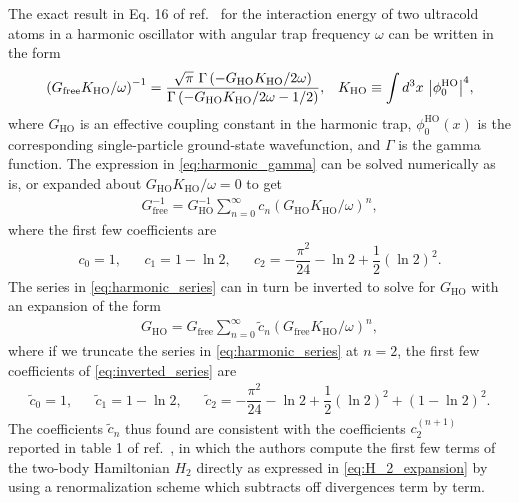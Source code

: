 \documentclass[preprint,showkeys,nofootinbib]{revtex4-1}
\renewcommand{\t}{\text} %
\newcommand{\f}{\dfrac} %
\newcommand{\p}[1]{\left(#1\right)} %
\newcommand{\1}{\mathds{1}}
\begin{document}
The exact result in Eq. 16 of ref.~\cite{busch1998two} for the
interaction energy of two ultracold atoms in a harmonic oscillator
with angular trap frequency $\omega$ can be written in the form
\begin{align}
  \p{G_{\t{free}} K_{\t{HO}}/\omega}^{-1}
  = \f{\sqrt{\pi}~ \Gamma\p{-G_{\t{HO}}K_{\t{HO}}/2\omega}}
  {\Gamma\p{-G_{\t{HO}}K_{\t{HO}}/2\omega-1/2}},
  &&
  K_{\t{HO}} \equiv \int d^3x~ \abs{\phi_0^{\t{HO}}}^4,
  \label{eq:harmonic_gamma}
\end{align}
where $G_{\t{HO}}$ is an effective coupling constant in the harmonic
trap, $\phi_0^{\t{HO}}\p{x}$ is the corresponding single-particle
ground-state wavefunction, and $\Gamma$ is the gamma function.  The
expression in \eqref{eq:harmonic_gamma} can be solved numerically as
is, or expanded about $G_{\t{HO}}K_{\t{HO}}/\omega=0$ to get
\begin{align}
  G_{\t{free}}^{-1} = G_{\t{HO}}^{-1}
  \sum_{n=0}^\infty c_n \p{G_{\t{HO}}K_{\t{HO}}/\omega}^n,
  \label{eq:harmonic_series}
\end{align}
where the first few coefficients are
\begin{align}
  c_0 = 1,
  &&
  c_1 = 1 - \ln 2,
  &&
  c_2 = -\f{\pi^2}{24} - \ln 2 + \f12 \p{\ln 2}^2.
\end{align}
The series in \eqref{eq:harmonic_series} can in turn be inverted to
solve for $G_{\t{HO}}$ with an expansion of the form
\begin{align}
  G_{\t{HO}} = G_{\t{free}}
  \sum_{n=0}^\infty \tilde c_n \p{G_{\t{free}}K_{\t{HO}}/\omega}^n,
  \label{eq:inverted_series}
\end{align}
where if we truncate the series in \eqref{eq:harmonic_series} at
$n=2$, the first few coefficients of \eqref{eq:inverted_series} are
\begin{align}
  \tilde c_0 = 1,
  &&
  \tilde c_1 = 1 - \ln 2,
  &&
  \tilde c_2 = -\f{\pi^2}{24} - \ln 2 + \f12 \p{\ln 2}^2
  + \p{1 - \ln 2}^2.
  \label{eq:inverted_coefficients}
\end{align}
The coefficients $\tilde c_n$ thus found are consistent with the
coefficients $c_2^{(n+1)}$ reported in table 1 of
ref.~\cite{johnson2012effective}, in which the authors compute the
first few terms of the two-body Hamiltonian $H_2$ directly as
expressed in \eqref{eq:H_2_expansion} by using a renormalization
scheme which subtracts off divergences term by term.
\end{document}
